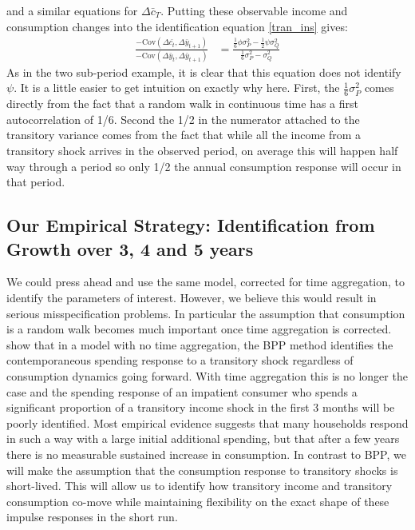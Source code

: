 \documentclass[titlepage]{\econtex}\newcommand{\texname}{IncomeUncertainty}
\begin{document}
and a similar equations for $\Delta \bar{c}_T$. Putting these observable income and consumption changes into the identification equation \ref{tran_ins} gives:
	\begin{align}
	\frac{-\mathrm{Cov}(\Delta \bar{c_t}, \Delta \bar{y}_{t+1})}{-\mathrm{Cov}( \Delta \bar{y}_t, \Delta \bar{y}_{t+1})}
	&= \frac{ \frac{1}{6}\phi \sigma^2_P - \frac{1}{2}\psi \sigma^2_Q}{ \frac{1}{6} \sigma^2_P -  \sigma^2_Q} \label{psi_cont}
	\end{align}
As in the two sub-period example, it is clear that this equation does not identify $\psi$. It is a little easier to get intuition on exactly why here. First, the $\frac{1}{6} \sigma^2_P$ comes directly from the fact that a random walk in continuous time has a first autocorrelation of 1/6. Second the 1/2 in the numerator attached to the transitory variance comes from the fact that while all the income from a transitory shock arrives in the observed period, on average this will happen half way through a period so only 1/2 the annual consumption response will occur in that period.

\subsection{Our Empirical Strategy: Identification from Growth over 3, 4 and 5 years}
We could press ahead and use the same model, corrected for time aggregation, to identify the parameters of interest. However, we believe this would result in serious misspecification problems. In particular the assumption that consumption is a random walk becomes much important once time aggregation is corrected. \cite{kaplan_how_2010} show that in a model with no time aggregation, the BPP method identifies the contemporaneous spending response to a transitory shock regardless of consumption dynamics going forward. With time aggregation this is no longer the case and the spending response of an impatient consumer who spends a significant proportion of a transitory income shock in the first 3 months will be poorly identified. Most empirical evidence suggests that many households respond in such a way with a large initial additional spending, but that after a few years there is no measurable sustained increase in consumption. In contrast to BPP, we will make the assumption that the consumption response to transitory shocks is short-lived. This will allow us to identify how transitory income and transitory consumption co-move while maintaining flexibility on the exact shape of these impulse responses in the short run.
\end{document}
